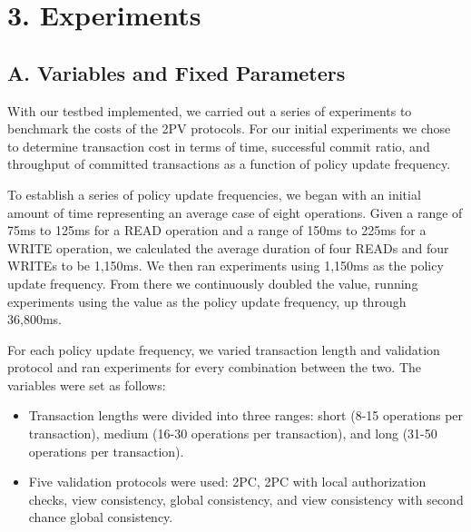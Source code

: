 \documentclass[11pt]{article}
\begin{document}
\section{3. Experiments}
\subsection{A. Variables and Fixed Parameters}
With our testbed implemented, we carried out a series of experiments to benchmark the costs of the 2PV protocols. For our initial experiments we chose to determine transaction cost in terms of time, successful commit ratio, and throughput of committed transactions as a function of policy update frequency.

To establish a series of policy update frequencies, we began with an initial amount of time representing an average case of eight operations. Given a range of 75ms to 125ms for a READ operation and a range of 150ms to 225ms for a WRITE operation, we calculated the average duration of four READs and four WRITEs to be 1,150ms. We then ran experiments using 1,150ms as the policy update frequency. From there we continuously doubled the value, running experiments using the value as the policy update frequency, up through 36,800ms.

For each policy update frequency, we varied transaction length and validation protocol and ran experiments for every combination between the two. The variables were set as follows:
\begin{itemize}
\item{}Transaction lengths were divided into three ranges: short (8-15 operations per transaction), medium (16-30 operations per transaction), and long (31-50 operations per transaction).
\item{}Five validation protocols were used: 2PC, 2PC with local authorization checks, view consistency, global consistency, and view consistency with second chance global consistency.
\end{itemize}
\end{document}
